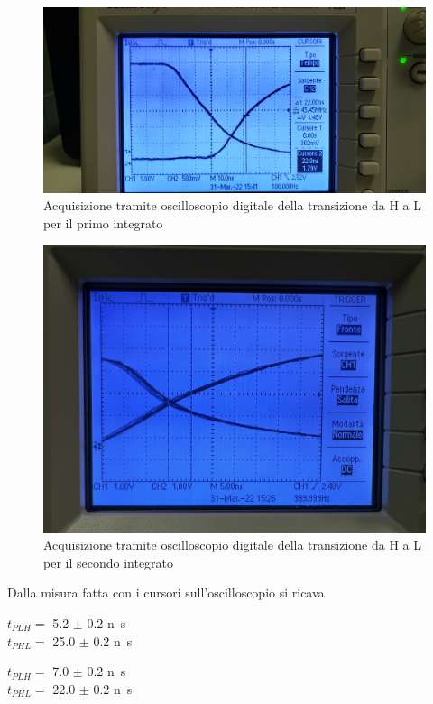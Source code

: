 \documentclass[10pt, a4paper, italian]{article}
\begin{document}
\begin{figure}[htbp]
\centering
	\includegraphics[width=\textwidth]{HL1}
	\caption{Acquisizione tramite oscilloscopio digitale della transizione da
	H a L per il primo integrato}
\end{figure}
\begin{figure}[htbp]
\centering
	\includegraphics[width=\textwidth]{HL2}
	\caption{Acquisizione tramite oscilloscopio digitale della transizione da
	H a L per il secondo integrato}
\end{figure}

Dalla misura fatta con i cursori sull'oscilloscopio si ricava
\begin{multicols}{2}
    \centering
    $t_{PLH}=$ 5.2 $\pm$ 0.2 \si{n\s} \\
    $t_{PHL}=$ 25.0 $\pm$ 0.2 \si{n\s}
    
    $t_{PLH}=$ 7.0 $\pm$ 0.2 \si{n\s} \\
    $t_{PHL}=$ 22.0 $\pm$ 0.2 \si{n\s}
\end{multicols}
\end{document}
